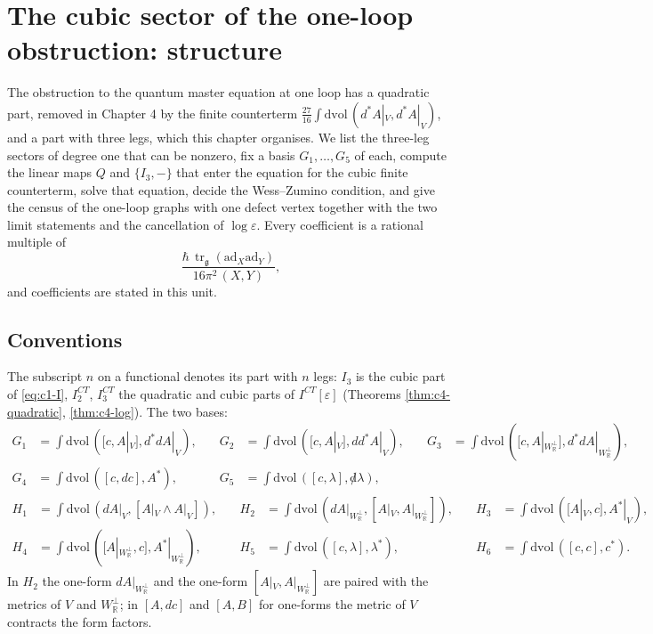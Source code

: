 \chapter{The cubic sector of the one-loop obstruction: structure}

The obstruction to the quantum master equation at one loop has a quadratic part, removed in Chapter 4 by the finite counterterm $\tfrac{27}{16}\int\mathrm{dvol}\,(d^*A|_V,d^*A|_V)$, and a part with three legs, which this chapter organises. We list the three-leg sectors of degree one that can be nonzero, fix a basis $G_1,\dots,G_5$ of each, compute the linear maps $Q$ and $\{I_3,-\}$ that enter the equation for the cubic finite counterterm, solve that equation, decide the Wess--Zumino condition, and give the census of the one-loop graphs with one defect vertex together with the two limit statements and the cancellation of $\log\varepsilon$. Every coefficient is a rational multiple of
\[
\frac{\hbar\,\operatorname{tr}_{\mathfrak g}(\mathrm{ad}_X\mathrm{ad}_Y)}{16\pi^2\,(X,Y)},
\]
and coefficients are stated in this unit.

\section{Conventions}

The subscript $n$ on a functional denotes its part with $n$ legs: $I_3$ is the cubic part of \eqref{eq:c1-I}, $I^{CT}_2$, $I^{CT}_3$ the quadratic and cubic parts of $I^{CT}[\varepsilon]$ (Theorems \ref{thm:c4-quadratic}, \ref{thm:c4-log}). The two bases:
\[
\begin{aligned}
G_1&=\int\mathrm{dvol}\,([c,A|_V],d^*dA|_V),&\quad G_2&=\int\mathrm{dvol}\,([c,A|_V],dd^*A|_V),&\quad G_3&=\int\mathrm{dvol}\,([c,A|_{W_{\mathbb R}^\perp}],d^*dA|_{W_{\mathbb R}^\perp}),\\
G_4&=\int\mathrm{dvol}\,([c,dc],A^*),&\quad G_5&=\int\mathrm{dvol}\,([c,\lambda],{\not d}\lambda),
\end{aligned}
\]
\[
\begin{aligned}
H_1&=\int\mathrm{dvol}\,(dA|_V,[A|_V\wedge A|_V]),&\quad H_2&=\int\mathrm{dvol}\,(dA|_{W_{\mathbb R}^\perp},[A|_V,A|_{W_{\mathbb R}^\perp}]),&\quad H_3&=\int\mathrm{dvol}\,([A|_V,c],A^*|_V),\\
H_4&=\int\mathrm{dvol}\,([A|_{W_{\mathbb R}^\perp},c],A^*|_{W_{\mathbb R}^\perp}),&\quad H_5&=\int\mathrm{dvol}\,([c,\lambda],\lambda^*),&\quad H_6&=\int\mathrm{dvol}\,([c,c],c^*).
\end{aligned}
\]
In $H_2$ the one-form $dA|_{W_{\mathbb R}^\perp}$ and the one-form $[A|_V,A|_{W_{\mathbb R}^\perp}]$ are paired with the metrics of $V$ and $W_{\mathbb R}^\perp$; in $[A,dc]$ and $[A,B]$ for one-forms the metric of $V$ contracts the form factors.

